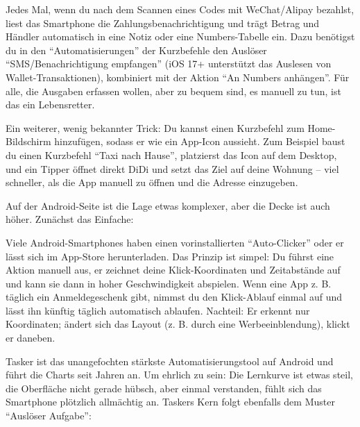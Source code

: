 
Jedes Mal, wenn du nach dem Scannen eines Codes mit WeChat/Alipay bezahlst, liest das Smartphone die Zahlungsbenachrichtigung und trägt Betrag und Händler automatisch in eine Notiz oder eine Numbers-Tabelle ein. Dazu benötigst du in den “Automatisierungen” der Kurzbefehle den Auslöser “SMS/Benachrichtigung empfangen” (iOS 17+ unterstützt das Auslesen von Wallet-Transaktionen), kombiniert mit der Aktion “An Numbers anhängen”. Für alle, die Ausgaben erfassen wollen, aber zu bequem sind, es manuell zu tun, ist das ein Lebensretter.

Ein weiterer, wenig bekannter Trick: Du kannst einen Kurzbefehl zum Home-Bildschirm hinzufügen, sodass er wie ein App-Icon aussieht. Zum Beispiel baust du einen Kurzbefehl “Taxi nach Hause”, platzierst das Icon auf dem Desktop, und ein Tipper öffnet direkt DiDi und setzt das Ziel auf deine Wohnung – viel schneller, als die App manuell zu öffnen und die Adresse einzugeben.


Auf der Android-Seite ist die Lage etwas komplexer, aber die Decke ist auch höher. Zunächst das Einfache:


Viele Android-Smartphones haben einen vorinstallierten “Auto-Clicker” oder er lässt sich im App-Store herunterladen. Das Prinzip ist simpel: Du führst eine Aktion manuell aus, er zeichnet deine Klick-Koordinaten und Zeitabstände auf und kann sie dann in hoher Geschwindigkeit abspielen. Wenn eine App z. B. täglich ein Anmeldegeschenk gibt, nimmst du den Klick-Ablauf einmal auf und lässt ihn künftig täglich automatisch ablaufen. Nachteil: Er erkennt nur Koordinaten; ändert sich das Layout (z. B. durch eine Werbeeinblendung), klickt er daneben.


Tasker ist das unangefochten stärkste Automatisierungstool auf Android und führt die Charts seit Jahren an. Um ehrlich zu sein: Die Lernkurve ist etwas steil, die Oberfläche nicht gerade hübsch, aber einmal verstanden, fühlt sich das Smartphone plötzlich allmächtig an. Taskers Kern folgt ebenfalls dem Muster “Auslöser Aufgabe”:


